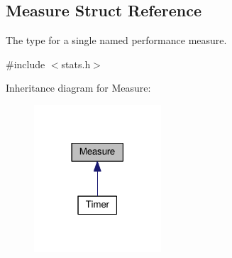 \hypertarget{structMeasure}{}\subsection{Measure Struct Reference}
\label{structMeasure}


The type for a single named performance measure.  




{\ttfamily \#include $<$stats.\+h$>$}



Inheritance diagram for Measure\+:\nopagebreak
\begin{figure}[H]
\begin{center}
\leavevmode
\includegraphics[width=134pt]{structMeasure__inherit__graph}
\end{center}
\end{figure}
